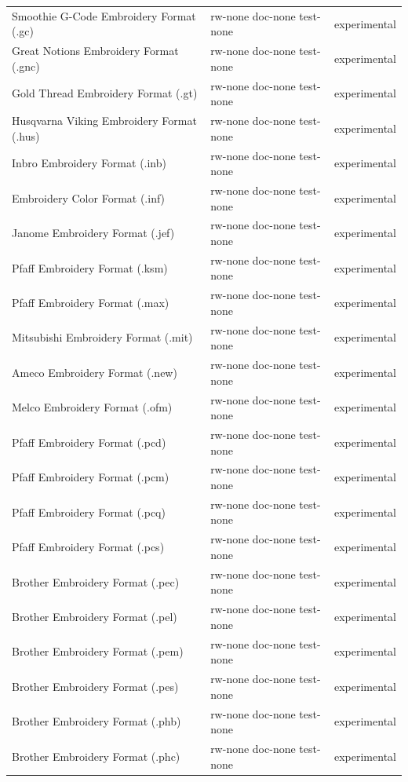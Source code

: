 \documentclass{report}
\begin{document}
\begin{longtable}{l l l}
Smoothie G-Code Embroidery Format (.gc) & rw-none doc-none test-none & experimental \\
Great Notions Embroidery Format (.gnc) & rw-none doc-none test-none & experimental \\
Gold Thread Embroidery Format (.gt) & rw-none doc-none test-none & experimental \\
Husqvarna Viking Embroidery Format (.hus) & rw-none doc-none test-none & experimental \\
Inbro Embroidery Format (.inb) & rw-none doc-none test-none & experimental \\
Embroidery Color Format (.inf) & rw-none doc-none test-none & experimental \\
Janome Embroidery Format (.jef) & rw-none doc-none test-none & experimental \\
Pfaff Embroidery Format (.ksm) & rw-none doc-none test-none & experimental \\
Pfaff Embroidery Format (.max) & rw-none doc-none test-none & experimental \\
Mitsubishi Embroidery Format (.mit) & rw-none doc-none test-none & experimental \\
Ameco Embroidery Format (.new) & rw-none doc-none test-none & experimental \\
Melco Embroidery Format (.ofm) & rw-none doc-none test-none & experimental \\
Pfaff Embroidery Format (.pcd) & rw-none doc-none test-none & experimental \\
Pfaff Embroidery Format (.pcm) & rw-none doc-none test-none & experimental \\
Pfaff Embroidery Format (.pcq) & rw-none doc-none test-none & experimental \\
Pfaff Embroidery Format (.pcs) & rw-none doc-none test-none & experimental \\
Brother Embroidery Format (.pec) & rw-none doc-none test-none & experimental \\
Brother Embroidery Format (.pel) & rw-none doc-none test-none & experimental \\
Brother Embroidery Format (.pem) & rw-none doc-none test-none & experimental \\
Brother Embroidery Format (.pes) & rw-none doc-none test-none & experimental \\
Brother Embroidery Format (.phb) & rw-none doc-none test-none & experimental \\
Brother Embroidery Format (.phc) & rw-none doc-none test-none & experimental \\

\end{longtable}
\end{document}
